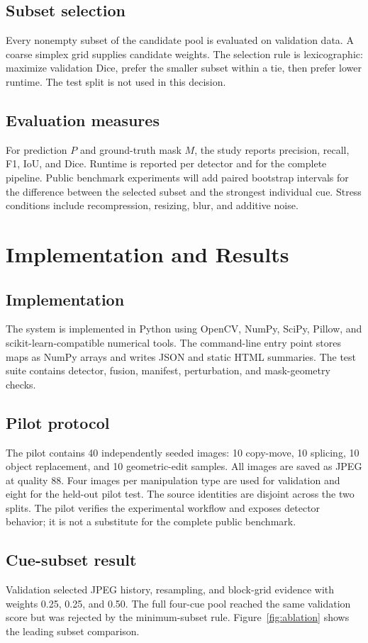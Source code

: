 \documentclass[sigconf,nonacm]{acmart}
\begin{document}
\subsection{Subset selection}
Every nonempty subset of the candidate pool is evaluated on validation data. A coarse simplex grid supplies candidate weights. The selection rule is lexicographic: maximize validation Dice, prefer the smaller subset within a tie, then prefer lower runtime. The test split is not used in this decision.

\subsection{Evaluation measures}
For prediction $P$ and ground-truth mask $M$, the study reports precision, recall, F1, IoU, and Dice. Runtime is reported per detector and for the complete pipeline. Public benchmark experiments will add paired bootstrap intervals for the difference between the selected subset and the strongest individual cue. Stress conditions include recompression, resizing, blur, and additive noise.

\section{Implementation and Results}
\subsection{Implementation}
The system is implemented in Python using OpenCV, NumPy, SciPy, Pillow, and scikit-learn-compatible numerical tools. The command-line entry point stores maps as NumPy arrays and writes JSON and static HTML summaries. The test suite contains detector, fusion, manifest, perturbation, and mask-geometry checks.

\subsection{Pilot protocol}
The pilot contains 40 independently seeded images: 10 copy-move, 10 splicing, 10 object replacement, and 10 geometric-edit samples. All images are saved as JPEG at quality 88. Four images per manipulation type are used for validation and eight for the held-out pilot test. The source identities are disjoint across the two splits. The pilot verifies the experimental workflow and exposes detector behavior; it is not a substitute for the complete public benchmark.

\subsection{Cue-subset result}
Validation selected JPEG history, resampling, and block-grid evidence with weights 0.25, 0.25, and 0.50. The full four-cue pool reached the same validation score but was rejected by the minimum-subset rule. Figure~\ref{fig:ablation} shows the leading subset comparison.
\end{document}
